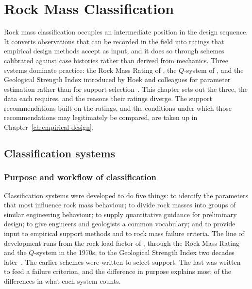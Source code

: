 \chapter{Rock Mass Classification}
\label{ch:classification}

Rock mass classification occupies an intermediate position in the design
sequence. It converts observations that can be recorded in the field into
ratings that empirical design methods accept as input, and it does so through
schemes calibrated against case histories rather than derived from mechanics.
Three systems dominate practice: the Rock Mass Rating of
\citet{bieniawski1989rmr}, the $Q$-system of
\citet{barton1974q}, and the Geological Strength Index introduced
by Hoek and colleagues for parameter estimation rather than for support
selection~\citep{marinos2000gsi}. This chapter sets out the three, the data
each requires, and the reasons their ratings diverge. The support
recommendations built on the ratings, and the conditions under which those
recommendations may legitimately be compared, are taken up in
Chapter~\ref{ch:empirical-design}.

\section{Classification systems}
\label{sec:classification-systems}

\subsection{Purpose and workflow of classification}
\label{sec:purpose-and-workflow-of-classification}

Classification systems were developed to do five things: to identify the
parameters that most influence rock mass behaviour; to divide rock masses into
groups of similar engineering behaviour; to supply quantitative guidance for
preliminary design; to give engineers and geologists a common vocabulary; and
to provide input to empirical support methods and to rock mass failure
criteria. The line of development runs from the rock load factor of
\citet{terzaghi1946rockload}, through the Rock Mass Rating and the $Q$-system
in the 1970s, to the Geological Strength Index two decades
later~\citep{hoek1995support}. The earlier schemes were written to select
support. The last was written to feed a failure criterion, and the difference
in purpose explains most of the differences in what each system counts.

